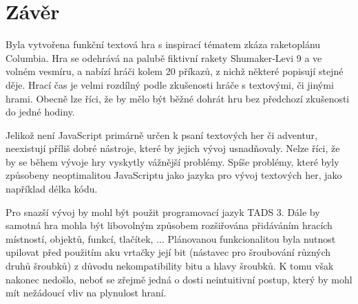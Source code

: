 \documentclass[main.tex]{subfiles}
\begin{document}
\section{Závěr} 
Byla vytvořena funkční textová hra s inspirací tématem zkáza raketoplánu Columbia. Hra se odehrává na palubě fiktivní rakety Shumaker-Levi 9 a ve volném vesmíru, a nabízí hráči kolem 20 příkazů, z nichž některé popisují stejné děje. Hrací čas je velmi rozdílný podle zkušenosti hráče s textovými, či jinými hrami. Obecně lze říci, že by mělo být běžné dohrát hru bez předchozí zkušenosti do jedné hodiny. 

Jelikož není JavaScript primárně určen k psaní textových her či adventur, neexistují příliš dobré nástroje, které by jejich vývoj usnadňovaly. Nelze říci, že by se během vývoje hry vyskytly vážnější problémy. Spíše problémy, které byly způsobeny neoptimalitou JavaScriptu jako jazyka pro vývoj textových her, jako například délka kódu.

Pro snazší vývoj by mohl být použit programovací jazyk TADS 3. Dále by samotná hra mohla být libovolným způsobem rozšiřována přidáváním hracích místností, objektů, funkcí, tlačítek, ... Plánovanou funkcionalitou byla nutnost upilovat před použitím aku vrtačky její bit (nástavec pro šroubování různých druhů šroubků) z důvodu nekompatibility bitu a hlavy šroubků. K tomu však nakonec nedošlo, neboť se zřejmě jedná o dosti neintuitivní postup, který by mohl mít nežádoucí vliv na plynulost hraní. 
\end{document}
